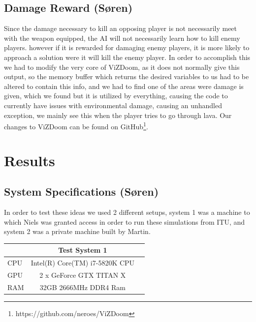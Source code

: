 \documentclass{article}
\begin{document}
\subsection{Damage Reward (Søren)}
Since the damage necessary to kill an opposing player is not necessarily meet with the weapon equipped, the AI will not necessarily learn how to kill enemy players. however if it is rewarded for damaging enemy players, it is more likely to approach a solution were it will kill the enemy player. In order to accomplish this we had to modify the very core of ViZDoom, as it does not normally give this output, so the memory buffer which returns the desired variables to us had to be altered to contain this info, and we had to find one of the areas were damage is given, which we found but it is utilized by everything, causing the code to currently have issues with environmental damage, causing an unhandled exception, we mainly see this when the player tries to go through lava. Our changes to ViZDoom can be found on GitHub\footnote{https://github.com/neroes/ViZDoom}.


\section{Results}



\subsection{System Specifications (Søren)}
\label{sec:systems}
In order to test these ideas we used 2 different setups, system 1 was a machine to which Niels was granted access in order to run these simulations from ITU, and system 2 was a private machine built by Martin.
\begin{center}
  \begin{tabular}{ | l | c | r | }
    \hline
      & Test System 1 \\ \hline
    CPU & Intel(R) Core(TM) i7-5820K CPU   \\ \hline 
    GPU & 2 x GeForce GTX TITAN X \\ \hline
    RAM & 32GB 2666MHz DDR4 Ram \\ \hline
  \end{tabular}
\end{center}
\end{document}
